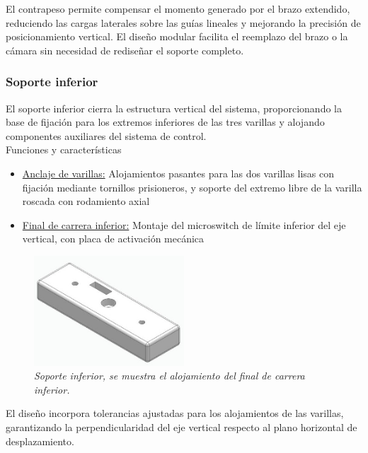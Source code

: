 El contrapeso permite compensar el momento generado por el brazo extendido, reduciendo las cargas laterales sobre las guías lineales y mejorando la precisión de posicionamiento vertical. El diseño modular facilita el reemplazo del brazo o la cámara sin necesidad de rediseñar el soporte completo.

\subsubsection{Soporte inferior}

El soporte inferior cierra la estructura vertical del sistema, proporcionando la base de fijación para los extremos inferiores de las tres varillas y alojando componentes auxiliares del sistema de control.\\

Funciones y características

\begin{itemize}[label=$\bullet$]
    \item \underline{Anclaje de varillas:} Alojamientos pasantes para las dos varillas lisas con fijación mediante tornillos prisioneros, y soporte del extremo libre de la varilla roscada con rodamiento axial
    \item \underline{Final de carrera inferior:} Montaje del microswitch de límite inferior del eje vertical, con placa de activación mecánica
\end{itemize}

\begin{figure}[H]
    \centering
    \includegraphics[width=0.5\textwidth]{img/InferiorReal_simplificado_vista.jpg}
    \caption{\textit{Soporte inferior, se muestra el alojamiento del final de carrera inferior.}}
    \label{fig:soporte_inferior_real}
\end{figure}

El diseño incorpora tolerancias ajustadas para los alojamientos de las varillas, garantizando la perpendicularidad del eje vertical respecto al plano horizontal de desplazamiento.

